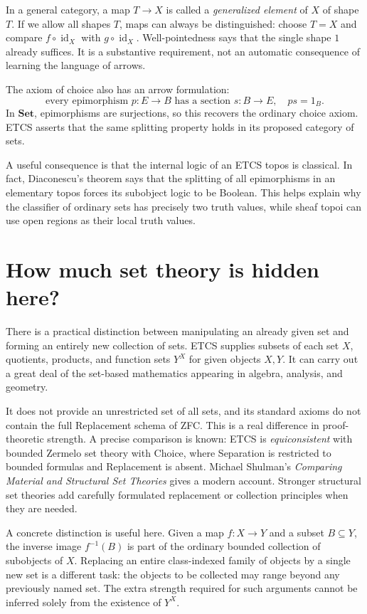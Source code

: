 In a general category, a map $T\to X$ is called a \emph{generalized element} of $X$ of shape $T$. If we allow all shapes $T$, maps can always be distinguished: choose $T=X$ and compare $f\circ\operatorname{id}_X$ with $g\circ\operatorname{id}_X$. Well-pointedness says that the single shape $1$ already suffices. It is a substantive requirement, not an automatic consequence of learning the language of arrows.

The axiom of choice also has an arrow formulation:
\[
 \boxed{\text{every epimorphism }p:E\to B
        \text{ has a section }s:B\to E,\quad ps=1_B.}
\]
In $\mathbf{Set}$, epimorphisms are surjections, so this recovers the ordinary choice axiom. ETCS asserts that the same splitting property holds in its proposed category of sets.

A useful consequence is that the internal logic of an ETCS topos is classical. In fact, Diaconescu's theorem says that the splitting of all epimorphisms in an elementary topos forces its subobject logic to be Boolean. This helps explain why the classifier of ordinary sets has precisely two truth values, while sheaf topoi can use open regions as their local truth values.

\section{How much set theory is hidden here?}

There is a practical distinction between manipulating an already given set and forming an entirely new collection of sets. ETCS supplies subsets of each set $X$, quotients, products, and function sets $Y^X$ for given objects $X,Y$. It can carry out a great deal of the set-based mathematics appearing in algebra, analysis, and geometry.

It does not provide an unrestricted set of all sets, and its standard axioms do not contain the full Replacement schema of ZFC. This is a real difference in proof-theoretic strength. A precise comparison is known: ETCS is \emph{equiconsistent} with bounded Zermelo set theory with Choice, where Separation is restricted to bounded formulas and Replacement is absent. Michael Shulman's \emph{Comparing Material and Structural Set Theories} gives a modern account. Stronger structural set theories add carefully formulated replacement or collection principles when they are needed.

A concrete distinction is useful here. Given a map $f:X\to Y$ and a subset $B\subseteq Y$, the inverse image $f^{-1}(B)$ is part of the ordinary bounded collection of subobjects of $X$. Replacing an entire class-indexed family of objects by a single new set is a different task: the objects to be collected may range beyond any previously named set. The extra strength required for such arguments cannot be inferred solely from the existence of $Y^X$.

